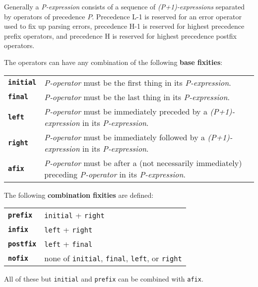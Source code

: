 \documentclass[12pt]{article}
\newcommand{\key}[1]{{\rm \bfseries #1}}
\newcommand{\ttkey}[1]{{\tt \bfseries #1}}
\begin{document}
Generally
a {\em P-expression} consists of a sequence of {\em (P+1)-expressions}
separated by operators of precedence $P$.
Precedence L-1 is reserved for an error operator used to fix up parsing errors,
precedence H-1 is reserved for highest precedence prefix operators,
and precedence H is reserved for highest precedence postfix operators.

The operators can have any combination of the following \key{base fixities}:

\begin{center}
\begin{tabular}{lp{5.0in}}
\ttkey{initial}	& {\em P-operator} must be the first thing
                  in its {\em P-expression}. \\
\ttkey{final}	& {\em P-operator} must be the last thing
                  in its {\em P-expression}. \\
\ttkey{left}	& {\em P-operator} must be immediately
                  preceded by a {\em (P+1)-expression}
                  in its {\em P-expression}. \\
\ttkey{right}	& {\em P-operator} must be immediately
                  followed by a {\em (P+1)-expression}
                  in its {\em P-expression}. \\
\ttkey{afix}	& {\em P-operator} must be after a (not necessarily
                  immediately) preceding {\em P-operator}
                  in its {\em P-expression}. \\
\end{tabular}
\end{center}

The following \key{combination fixities} are defined:

\begin{center}
\begin{tabular}{ll}
\ttkey{prefix}	& {\tt initial} + {\tt right} \\
\ttkey{infix}	& {\tt left} + {\tt right} \\
\ttkey{postfix}	& {\tt left} + {\tt final} \\
\ttkey{nofix}	& none of {\tt initial}, {\tt final}, {\tt left},
                  or {\tt right} \\
\end{tabular}
\end{center}

All of these but {\tt initial} and {\tt prefix} can be combined with {\tt afix}.

\newpage
\end{document}
